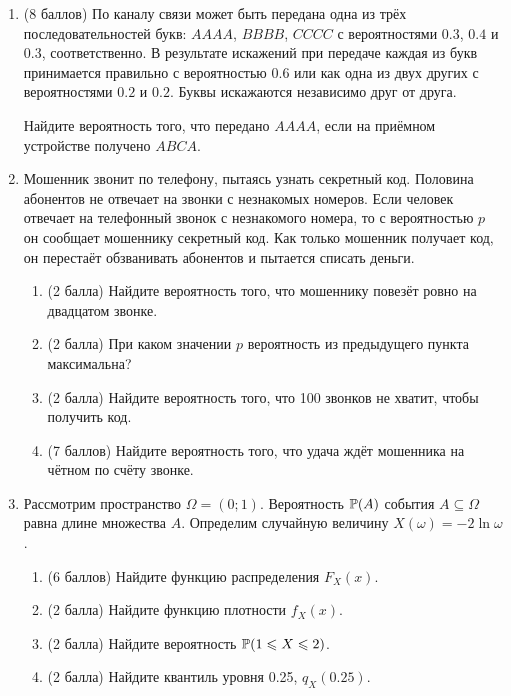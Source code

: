 \begin{enumerate}


\item (8 баллов) По каналу связи может быть передана одна из трёх последовательностей букв: $AAAA$, $BBBB$, $CCCC$ с вероятностями $0.3$, $0.4$ и $0.3$, соответственно. 
В результате искажений при передаче каждая из букв принимается правильно с вероятностью $0.6$ или как одна из двух других с вероятностями $0.2$ и $0.2$. 
Буквы искажаются независимо друг от друга.
 
Найдите вероятность того, что передано $AAAA$, если на приёмном устройстве получено $ABCA$.
 
 
 \item Мошенник звонит по телефону, пытаясь узнать секретный код. 
Половина абонентов не отвечает на звонки с незнакомых номеров. 
Если человек отвечает на телефонный звонок с незнакомого номера, то с вероятностью $p$ он сообщает мошеннику секретный код. 
Как только мошенник получает код, он перестаёт обзванивать абонентов и пытается списать деньги. 
\begin{enumerate}
\item (2 балла) Найдите вероятность того, что мошеннику повезёт ровно на двадцатом звонке.
\item (2 балла) При каком значении $p$ вероятность из предыдущего пункта максимальна?
\item (2 балла) Найдите вероятность того, что 100 звонков не хватит, чтобы получить код.
\item (7 баллов) Найдите вероятность того, что удача ждёт мошенника на чётном по счёту звонке.
\end{enumerate}

 \item Рассмотрим пространство $\Omega=(0 ; 1)$. 
 Вероятность $\P(A)$ события $A \subseteq \Omega$ равна длине множества $A$.
 Определим случайную величину $X(\omega)=-2 \ln \omega$. 
 \begin{enumerate}
 \item (6 баллов) Найдите функцию распределения $F_X(x)$.
 \item (2 балла) Найдите функцию плотности $f_X(x)$.
 \item (2 балла) Найдите вероятность $\P( 1 \leq X \leq 2 )$.
 \item (2 балла) Найдите квантиль уровня 0.25, $q_X(0.25)$.
 \end{enumerate}
 

\end{enumerate}
